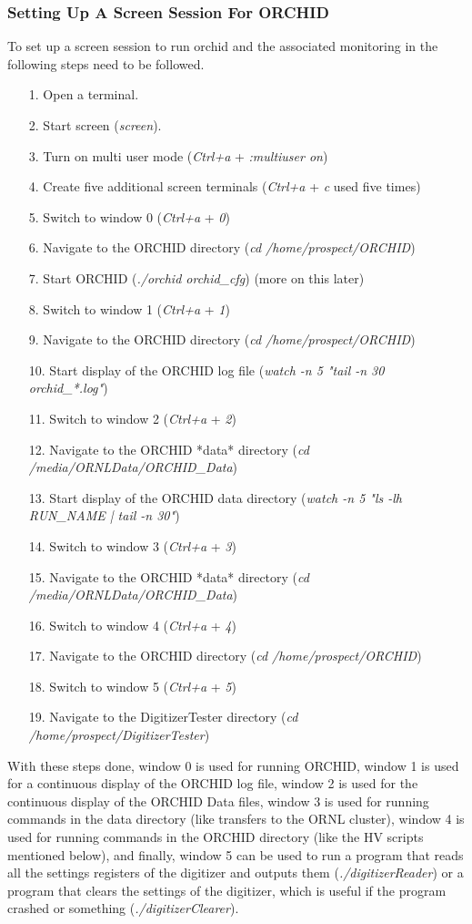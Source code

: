 \documentclass[onecolumn, 10pt, letterpaper, twoside]{article}
\begin{document}
\subsubsection{Setting Up A Screen Session For ORCHID} 
To set up a screen session to run orchid and the associated monitoring in the following steps need to be followed.
\begin{itemize}
\item[1.] Open a terminal.
\item[2.] Start screen (\emph{screen}).
\item[3.] Turn on multi user mode (\emph{Ctrl+a} + \emph{:multiuser on})
\item[4.] Create five additional screen terminals (\emph{Ctrl+a} + \emph{c} used five times)
\item[5.] Switch to window 0 (\emph{Ctrl+a} + \emph{0})
\item[6.] Navigate to the ORCHID directory (\emph{cd /home/prospect/ORCHID})
\item[7.] Start ORCHID (\emph{./orchid orchid\_cfg}) (more on this later)
\item[8.] Switch to window 1 (\emph{Ctrl+a} + \emph{1})
\item[9.] Navigate to the ORCHID directory (\emph{cd /home/prospect/ORCHID})
\item[10.] Start display of the ORCHID log file (\emph{watch -n 5 "tail -n 30 orchid\_*.log"})
\item[11.] Switch to window 2 (\emph{Ctrl+a} + \emph{2})
\item[12.] Navigate to the ORCHID *data* directory (\emph{cd /media/ORNLData/ORCHID\_Data})
\item[13.] Start display of the ORCHID data directory (\emph{watch -n 5 "ls -lh RUN\_NAME | tail -n 30"})
\item[14.] Switch to window 3 (\emph{Ctrl+a} + \emph{3})
\item[15.] Navigate to the ORCHID *data* directory (\emph{cd /media/ORNLData/ORCHID\_Data})
\item[16.] Switch to window 4 (\emph{Ctrl+a} + \emph{4})
\item[17.] Navigate to the ORCHID directory (\emph{cd /home/prospect/ORCHID})
\item[18.] Switch to window 5 (\emph{Ctrl+a} + \emph{5})
\item[19.] Navigate to the DigitizerTester directory (\emph{cd /home/prospect/DigitizerTester})
\end{itemize}
With these steps done, window 0 is used for running ORCHID, window 1 is used for a continuous display of the ORCHID log file, window 2 is used for the continuous display of the ORCHID Data files, window 3 is used for running commands in the data directory (like transfers to the ORNL cluster), window 4 is used for running commands in the ORCHID directory (like the HV scripts mentioned below), and finally, window 5 can be used to run a program that reads all the settings registers of the digitizer and outputs them (\emph{./digitizerReader}) or a program that clears the settings of the digitizer, which is useful if the program crashed or something (\emph{./digitizerClearer}).
\end{document}
